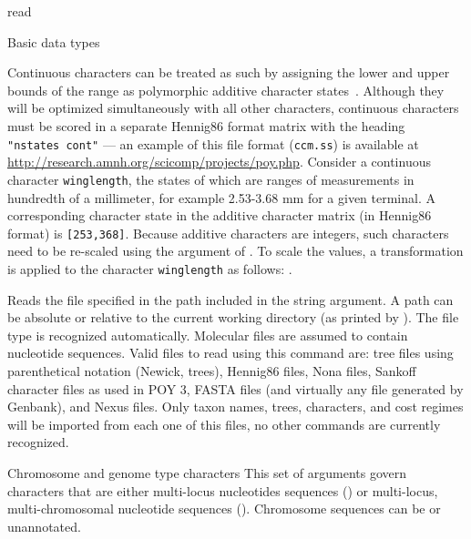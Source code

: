 \begin{command}{read}{}
\begin{arguments}
\begin{argumentgroup}{Basic data types}
            \begin{statement}
                Continuous characters can be treated as such by assigning the lower
                and upper bounds of the range as polymorphic additive character 
                states~\cite{goloboffetal2006}.    Although they will be optimized 
                simultaneously with all other characters, continuous characters 
                must be scored in a separate Hennig86 format matrix with the heading 
                \texttt{ "nstates cont"} --- an example of this file format (\texttt{ccm.ss})
                is available at \url{http://research.amnh.org/scicomp/projects/poy.php}.
                Consider a continuous character  \texttt{winglength}, the states of 
                which are ranges of measurements in hundredth of a millimeter,  
                for example 2.53-3.68 mm for a given terminal. A corresponding 
                character state in the  additive character matrix (in Hennig86 format) is 
                \texttt{[253,368]}. Because additive characters are integers, such 
                characters need to be re-scaled using the  
                argument of .  To scale the values, a transformation 
                is applied to the character \texttt{winglength} as follows:
                .
            \end{statement}
             
                {Reads the file specified in the path included in the string argument.
                A path can be absolute or relative to the current working
                directory (as printed by ). The file type is
                recognized automatically.  Molecular files are assumed to
                contain nucleotide sequences. Valid files to read using this
                command are: tree files using parenthetical notation (Newick,
                \poy trees), Hennig86 files, Nona files, Sankoff character files
                as used in POY 3, FASTA files (and virtually any file generated
                by Genbank), and Nexus files. Only taxon names, trees,
                characters, and cost regimes will be imported from each one of
                this files, no other commands are currently recognized.}
                {}
        \end{argumentgroup}
     
        \begin{argumentgroup}{Chromosome and genome type characters}          
             This set of arguments govern characters that are either multi-locus
            nucleotides sequences () or multi-locus,
            multi-chromosomal nucleotide sequences ().
            Chromosome sequences can be  or unannotated.
            

\end{argumentgroup}
\end{arguments}
\end{command}
